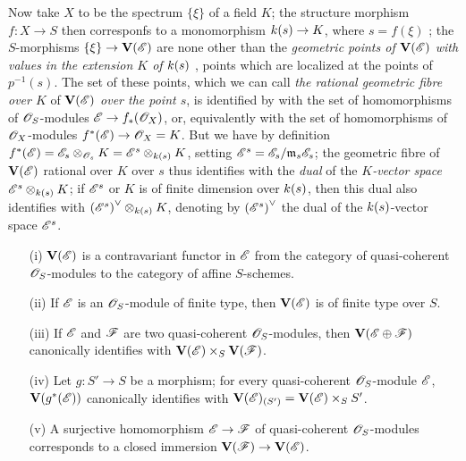 \begin{env}[1.7.10]
\label{II.1.7.10}
Now take $X$ to be the spectrum $\{\xi\}$ of a field $K$; the structure morphism $f:X\to S$ then corresponfs to a monomorphism $\kres(s)\to K$, where $s=f(\xi)$ ; the $S$-morphisms $\{\xi\}\to\bb{V}(\sh{E})$ are none other than the \emph{geometric points of $\mathbf{V}(\mathscr{E})$ with values in the extension $K$ of $k(s)$} , points which are localized at the points of $p^{-1}(s)$.
The set of these points, which we can call \emph{the rational geometric fibre over $K$} of $\mathbf{V}(\mathscr{E})$ \emph{over the point $s$}, is identified by  with the set of homomorphisms of $\mathscr{O}_S$-modules $\sh{E}\to f_*(\sh{O}_X)$, or, equivalently  with the set of homomorphisms of $\mathscr{O}_X$-modules $f^*(\sh{E})\to\sh{O}_X=K$.
But we have by definition  $f^*(\mathscr{E})=\mathscr{E}_s\otimes_{\mathscr{O}_s}K=\mathscr{E}^s\otimes_{k(s)}K$, setting $\mathscr{E}^s=\mathscr{E}_s/\mathfrak{m}_s\mathscr{E}_s$; the geometric fibre of $\mathbf{V}(\mathscr{E})$ rational over $K$ over $s$ thus identifies with the \emph{dual} of the \emph{$K$-vector space $\mathscr{E}^s\otimes_{k(s)}K$}; if $\mathscr{E}^s$ or $K$ is of finite dimension over $k(s)$, then this dual also identifies with ${(\mathscr{E}^s)}^\vee\otimes_{k(s)}K$, denoting by ${(\mathscr{E}^s)}^\vee$ the dual of the $k(s)$-vector space $\mathscr{E}^s$.
\end{env}

\begin{proposition}[1.7.11]
\label{II.1.7.11}
\medskip\noindent
\begin{enumerate}
  \item[{\rm(i)}] $\mathbf{V}(\mathscr{E})$ is a contravariant functor in $\mathscr{E}$ from the category of quasi-coherent $\mathscr{O}_S$-modules to the category of affine $S$-schemes.
  \item[{\rm(ii)}] If $\mathscr{E}$ is an $\mathscr{O}_S$-module of finite type, then $\mathbf{V}(\mathscr{E})$ is of finite type over $S$.
  \item[{\rm(iii)}] If $\mathscr{E}$ and $\mathscr{F}$ are two quasi-coherent $\mathscr{O}_S$-modules, then $\mathbf{V}(\mathscr{E}\oplus\mathscr{F})$ canonically identifies with $\mathbf{V}(\mathscr{E})\times_S\mathbf{V}(\mathscr{F})$.
  \item[{\rm(iv)}] Let $g:S'\to S$ be a morphism; for every quasi-coherent $\mathscr{O}_S$-module $\mathscr{E}$, $\mathbf{V}(g^*(\mathscr{E}))$ canonically identifies with $\mathbf{V}(\mathscr{E})_{(S')}=\mathbf{V}(\mathscr{E})\times_S S'$.
  \item[{\rm(v)}] A surjective homomorphism $\sh{E}\to\sh{F}$ of quasi-coherent $\mathscr{O}_S$-modules corresponds to a closed immersion $\bb{V}(\sh{F})\to\bb{V}(\sh{E})$.
\end{enumerate}
\end{proposition}


